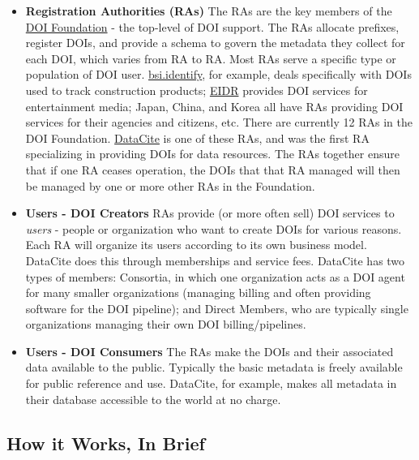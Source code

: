 \documentclass[11pt,a4paper]{ivoa}
\begin{document}
\begin{itemize}
\item{} \textbf{Registration Authorities (RAs)}\newline
The RAs are the key members of the \href{https://www.doi.org/}{DOI Foundation} - the top-level of DOI support. The RAs allocate prefixes, register DOIs, and provide a schema to govern the metadata they collect for each DOI, which varies from RA to RA. Most RAs serve a specific type or population of DOI user.\newline
\href{https://identify.bsigroup.com/}{bsi.identify}, for example, deals specifically with DOIs used to track construction products; \href{https://www.eidr.org/}{EIDR} provides DOI services for entertainment media; Japan, China, and Korea all have RAs providing DOI services for their agencies and citizens, etc. There are currently 12 RAs in the DOI Foundation. \href{https://datacite.org/}{DataCite} is one of these RAs, and was the first RA specializing in providing DOIs for data resources. The RAs together ensure that if one RA ceases operation, the DOIs that that RA managed will then be managed by one or more other RAs in the Foundation.

\item{} \textbf{Users - DOI Creators}\newline
RAs provide (or more often sell) DOI services to \emph{users} - people or organization who want to create DOIs for various reasons. Each RA will organize its users according to its own business model. DataCite does this through memberships and service fees. DataCite has two types of members: Consortia, in which one organization acts as a DOI agent for many smaller organizations (managing billing and often providing software for the DOI pipeline); and Direct Members, who are typically single organizations managing their own DOI billing/pipelines.

\item{} \textbf{Users - DOI Consumers}\newline
The RAs make the DOIs and their associated data available to the public. Typically the basic metadata is freely available for public reference and use. DataCite, for example, makes all metadata in their database accessible to the world at no charge.
\end{itemize}

\subsection{How it Works, In Brief}\hypertarget{how-it-works-in-brief}{}\label{sec:how-it-works-in-brief}
\end{document}
